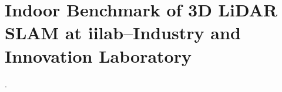 \chapter[Indoor Benchmark of 3D LiDAR SLAM at iilab]{Indoor Benchmark of 3D LiDAR SLAM at iilab--Industry and Innovation
Laboratory}\label{appx:iilabs3d}
\begin{description}[leftmargin=1cm,style=nextline,font=\normalfont]
\item[\cite{ribeiro:access:2025}] .
\end{description}

\cleardoublepage


